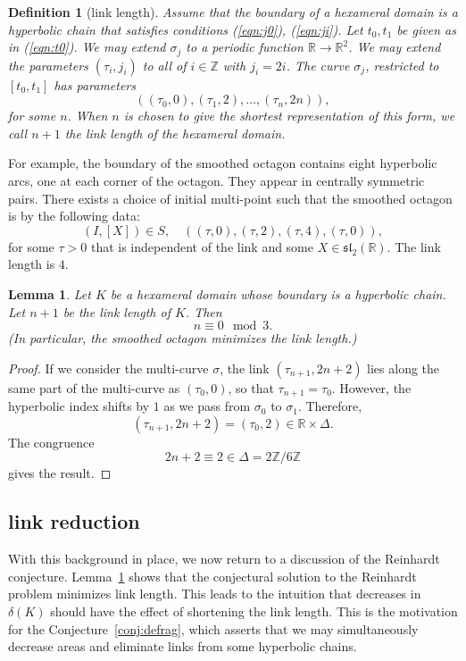 \documentclass[11pt]{amsart}
\newtheorem{definition}[equation]{Definition}
\newtheorem{lemma}[equation]{Lemma}
\newcommand{\ring}[1]{\mathbb{#1}}
\def\deltalat{\mathbb\delta}  %
\def\rZ{{\ring{Z}}}
\def\rR{{\ring{R}}}
\def\ta{{\tau}}
\begin{document}
\begin{definition}[link length]
Assume that the boundary of a hexameral domain is a hyperbolic
chain that satisfies conditions (\ref{eqn:j0}), (\ref{eqn:ji}).
Let $t_0,t_1$ be given as in (\ref{eqn:t0}).  We may extend
$\sigma_j$ to a periodic function $\rR\to\rR^2$.  We may extend
the parameters $(\ta_i,j_i)$ to all of $i\in\rZ$ with $j_i = 2i$.
The curve $\sigma_j$, restricted to $[t_0,t_1]$ has parameters
\[
((\ta_0,0),(\ta_1,2),\ldots,(\ta_n,2n)),
\]
for some $n$.  When $n$ is chosen to give the shortest representation
of this form, we call $n+1$ the {\it link length} of the hexameral
domain.
\end{definition}

For example, the boundary of the smoothed octagon contains eight
hyperbolic arcs, one at each corner of the octagon. They appear in
centrally symmetric pairs.  There exists a choice of initial
multi-point such that the smoothed octagon is by the following data:
\[
(I,[X])\in S,\quad ((\ta,0),(\ta,2),(\ta,4),(\ta,0)),
\]
for some $\ta>0$ that is independent of the link and some
$X\in\mathfrak{sl}_2(\rR)$.
The link length is $4$.

\begin{lemma}\label{lemma:link}  
  Let $K$ be a hexameral domain whose boundary is a hyperbolic chain.
  Let $n+1$ be the link length of $K$.  Then
\[n\equiv 0 \mod 3.\]
(In particular, the smoothed octagon minimizes the link length.)
\end{lemma}

\begin{proof} If we consider the multi-curve $\sigma$, the link
$(\ta_{n+1},2n+2)$ lies along the same part of the multi-curve as $(\ta_0,0)$,
so that $\ta_{n+1}=\ta_0$.  However, the hyperbolic index shifts by
$1$ as we pass from $\sigma_0$ to $\sigma_1$.  Therefore,
\[(\ta_{n+1},2n+2) = (\ta_0,2)\in \rR\times \Delta.\]
The congruence 
\[2n+2 \equiv 2\in \Delta = 2\rZ/6\rZ\]
gives the result.
\end{proof}

\subsection{link reduction}

With this background in place, we now return to a discussion of the
Reinhardt conjecture.  Lemma~\ref{lemma:link} shows that the
conjectural solution to the Reinhardt problem minimizes link
length.  This leads to the intuition 
that decreases in $\deltalat(K)$ should have
the effect of shortening the link length.  This is the motivation
for the Conjecture~\ref{conj:defrag}, which asserts that we may
simultaneously decrease areas and eliminate links
from some hyperbolic chains.   
\end{document}

